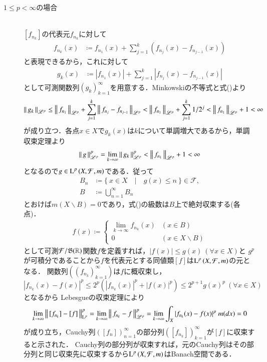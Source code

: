 \begin{qst}
\begin{prf}
\begin{description}
		\item[$1 \leq p < \infty$の場合]\mbox{}\\
			$[f_{n_k}]$の代表元$f_{n_k}$に対して
			\begin{align}	
				f_{n_k}(x) &\coloneqq f_{n_1}(x) + \sum_{j=1}^{k}(f_{n_j}(x) - f_{n_{j-1}}(x)) \label{eq:Lp_banach_3}
			\end{align}
			と表現できるから，これに対して
			\begin{align}
				g_k(x) &\coloneqq |f_{n_1}(x)| + \sum_{j=1}^{k}|f_{n_j}(x) - f_{n_{j-1}}(x)|
			\end{align}
			として可測関数列$(g_k)_{k=1}^{\infty}$を用意する．Minkowskiの不等式と式()より
			\begin{align}
				\left\|\, g_k\, \right\|_{\mathscr{L}^p} \leq \left\|\, f_{n_1}\, \right\|_{\mathscr{L}^p} + \sum_{j=1}^{k}\left\|\, f_{n_j} - f_{n_{j-1}}\, \right\|_{\mathscr{L}^p}
				< \left\|\, f_{n_1}\, \right\|_{\mathscr{L}^p} + \sum_{j=1}^{k} 1/2^j < \left\|\, f_{n_1}\, \right\|_{\mathscr{L}^p} + 1 < \infty
			\end{align}
			が成り立つ．各点$x \in X$で$g_k(x)$は$k$について単調増大であるから，単調収束定理より
			\begin{align}
				\left\|\, g\, \right\|_{\mathscr{L}^p}^p = \lim_{k \to \infty} \left\|\, g_k\, \right\|_{\mathscr{L}^p}^p < \left\|\, f_{n_1}\, \right\|_{\mathscr{L}^p} + 1 < \infty
			\end{align}
			となるので$g \in \operatorname{L}^{p} \left(X,\mathcal{F},m\right)$である．従って
			\begin{align}
				B_n &\coloneqq \{\ x \in X\quad |\quad g(x) \leq n\ \} \in \mathcal{F}, \\
				B &\coloneqq \bigcup_{n=1}^{\infty} B_n
			\end{align}
			とおけば$m(X \backslash B) = 0$であり，式()の級数は$B$上で絶対収束する(各点)．
			\begin{align}
				f(x) \coloneqq
				\begin{cases}
					\lim\limits_{k \to \infty} f_{n_k}(x) & (x \in B) \\
					0 & (x \in X \backslash B)
				\end{cases}
			\end{align}
			として可測$\mathcal{F}/\mathfrak{B}(\mathbb{R})$関数$f$を定義すれば，$|f(x)| \leq g(x)\ (\forall x \in X)$と
			$g^p$が可積分であることから$f$を代表元とする同値類$[f]$は$\operatorname{L}^{p} \left(X,\mathcal{F},m\right)$の元となる．
			関数列$(\left( f_{n_k} \right)_{k=1}^{\infty})$は$f$に概収束し，
			$|f_{n_k}(x) - f(x)|^p \leq 2^p(|f_{n_k}(x)|^p + |f(x)|^p) \leq 2^{p+1} g(x)^p\ (\forall x \in X)$となるから
			Lebesgueの収束定理により
			\begin{align}
				\lim_{k \to \infty}\Norm{[f_{n_k}] - [f]}{\mathrm{L}^p}^p
				= \lim_{k \to \infty}\Norm{f_{n_k} - f}{\mathscr{L}^p}^p
				= \lim_{k \to \infty} \int_X |f_{n_k}(x) - f(x)|^p\ m(dx) = 0
			\end{align}
			が成り立ち，Cauchy列$\left( [f_{n}] \right)_{n=1}^{\infty}$の部分列$\left( [f_{n_k}] \right)_{k=1}^{\infty}$が$[f]$に収束すると示された．
			Cauchy列の部分列が収束すれば，元のCauchy列はその部分列と同じ収束先に収束するから$\operatorname{L}^{p} \left(X,\mathcal{F},m\right)$はBanach空間である．
	\end{description}
	\QED
\end{prf}


\end{qst}
